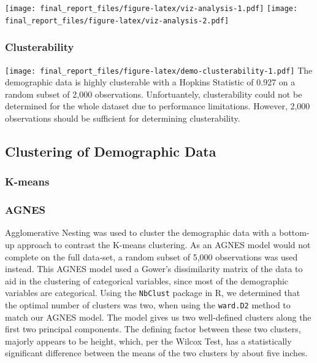 \documentclass[]{article}
\begin{document}
\texttt{[image: final\_report\_files/figure-latex/viz-analysis-1.pdf]}
\texttt{[image: final\_report\_files/figure-latex/viz-analysis-2.pdf]}

\hypertarget{clusterability}{%
\subsubsection{Clusterability}\label{clusterability}}

\texttt{[image: final\_report\_files/figure-latex/demo-clusterability-1.pdf]}
The demographic data is highly clusterable with a Hopkins Statistic of
0.927 on a random subset of 2,000 observations. Unfortuantely,
clusterability could not be determined for the whole dataset due to
performance limitations. However, 2,000 observations should be
sufficient for determining clusterability.

\hypertarget{clustering-of-demographic-data}{%
\subsection{Clustering of Demographic
Data}\label{clustering-of-demographic-data}}

\hypertarget{k-means}{%
\subsubsection{K-means}\label{k-means}}

\hypertarget{agnes}{%
\subsubsection{AGNES}\label{agnes}}

Agglomerative Nesting was used to cluster the demographic data with a
bottom-up approach to contrast the K-means clustering. As an AGNES model
would not complete on the full data-set, a random subset of 5,000
observations was used instead. This AGNES model used a Gower's
dissimilarity matrix of the data to aid in the clustering of categorical
variables, since most of the demographic variables are categorical.
Using the \texttt{NbClust} package in R, we determined that the optimal
number of clusters was two, when using the \texttt{ward.D2} method to
match our AGNES model. The model gives us two well-defined clusters
along the first two principal components. The defining factor between
these two clusters, majorly appears to be height, which, per the Wilcox
Test, has a statistically significant difference between the means of
the two clusters by about five inches.
\end{document}
